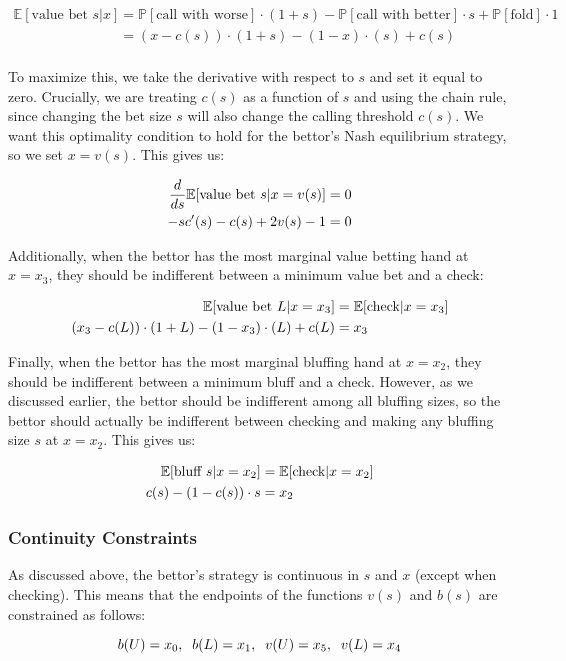 \documentclass[../../main/main.tex]{subfiles}
\begin{document}
\begin{align*}
    \mathbb{E}[\text{value bet } s | x] & = \mathbb{P}[\text{call with worse}] \cdot (1+s) - \mathbb{P}[\text{call with better}] \cdot s + \mathbb{P}[\text{fold}] \cdot 1 \\
    & = (x-c(s)) \cdot (1+s) - (1-x) \cdot (s) + c(s)\\
\end{align*}

To maximize this, we take the derivative with respect to $s$ and set it equal to zero. Crucially, we are treating $c(s)$ as a function of $s$ and using the chain rule, since changing the bet size $s$ will also change the calling threshold $c(s)$. We want this optimality condition to hold for the bettor's Nash equilibrium strategy, so we set $x=v(s)$. This gives us:

\begin{align}{\label{valueoptimality}}
    \nonumber \frac{d}{ds} \mathbb{E}[\text{value bet } s | x=v(s)] & = 0 \\
    -sc'(s) - c(s) + 2 v(s) - 1 & = 0
\end{align}

Additionally, when the bettor has the most marginal value betting hand at $x=x_3$, they should be indifferent between a minimum value bet and a check: 

\begin{align}{\label{valueindiff}}
    \nonumber \mathbb{E}[\text{value bet } L | x=x_3] & = \mathbb{E}[\text{check} | x=x_3]\\ 
    (x_3-c(L)) \cdot (1+L) - (1-x_3) \cdot (L) + c(L) & = x_3
\end{align}

Finally, when the bettor has the most marginal bluffing hand at $x=x_2$, they should be indifferent between a minimum bluff and a check. However, as we discussed earlier, the bettor should be indifferent among all bluffing sizes, so the bettor should actually be indifferent between checking and making any bluffing size $s$ at $x=x_2$. This gives us:

\begin{align}{\label{bluffindiff}}
    \nonumber \mathbb{E}[\text{bluff } s | x=x_2] & = \mathbb{E}[\text{check} | x=x_2]\\ 
    c(s) - (1-c(s)) \cdot s & = x_2
\end{align}

\subsubsection{Continuity Constraints}

As discussed above, the bettor's strategy is continuous in $s$ and $x$ (except when checking). This means that the endpoints of the functions $v(s)$ and $b(s)$ are constrained as follows:

\begin{equation}{\label{continuityconstraints}}
	 b(U) = x_0, \;\; b(L) = x_1, \;\; v(U) = x_5, \;\; v(L) = x_4
\end{equation}
\end{document}
